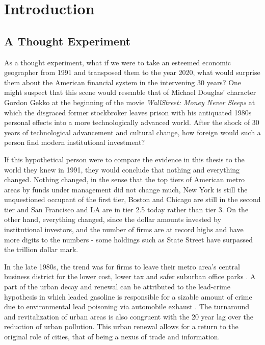 \chapter{Introduction}
\label{ChapterI}

\section{A Thought Experiment}

As a thought experiment, what if we were to take an esteemed economic geographer from 1991 and transposed them to the year 2020, what would surprise them about the American financial system in the intervening 30 years?  One might suspect that this scene would resemble that of Michael Douglas' character Gordon Gekko at the beginning of the movie \textit{WallStreet: Money Never Sleeps} at which the disgraced former stockbroker  leaves prison with his antiquated 1980s personal effects into a more technologically advanced world.  After the shock of 30 years of technological advancement and cultural change, how foreign would such a person find modern institutional investment?  

If this hypothetical person were to compare the evidence in this thesis to the world they knew in 1991, they would conclude that nothing and everything changed.  Nothing changed, in the sense that the top tiers of American metro areas by funds under management did not change much, New York is still the unquestioned occupant of the first tier, Boston and Chicago are still in the second tier and San Francisco and LA are in tier 2.5 today rather than tier 3.  On the other hand, everything changed, since the dollar amounts invested by institutional investors, and the number of firms are at record highs and have more digits to the numbers - some holdings such as State Street have surpassed the trillion dollar mark.  

In the late 1980s, the trend was for firms to leave their metro area's central business district for the lower cost, lower tax and safer suburban office parks \citep{bodenmanfirm2000}.  A part of the urban decay and renewal can be attributed to the lead-crime hypothesis in which leaded gasoline is responsible for a sizable amount of crime due to environmental lead poisoning via automobile exhaust \citep{feigenbaum2016lead,NBERw23392}.  The turnaround and revitalization of urban areas is also congruent with the 20 year lag over the reduction of urban pollution.  This urban renewal allows for a return to the original role of cities, that of being a nexus of trade and information. 


